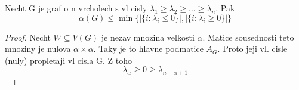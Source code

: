 \begin{theorem}
	Necht G je graf o n vrcholech s vl cisly $\lambda_1 \geq \lambda_2 \geq ... \geq \lambda_n$. Pak
	\[ \alpha(G) \leq \min\{|\{i : \lambda_i \leq 0\}|, |\{i : \lambda_i \geq 0\}|\} \]
\end{theorem}
\begin{proof}
	Necht $W \subseteq V(G)$ je nezav mnozina velkosti $\alpha$. Matice sousednosti teto mnoziny je nulova $\alpha \times \alpha$.
	Taky je to hlavne podmatice $A_G$. Proto jeji vl. cisle (nuly) propletaji vl cisla G. Z toho
	\[ \lambda_{\alpha} \geq 0 \geq \lambda_{n - \alpha + 1} \]
\end{proof}
